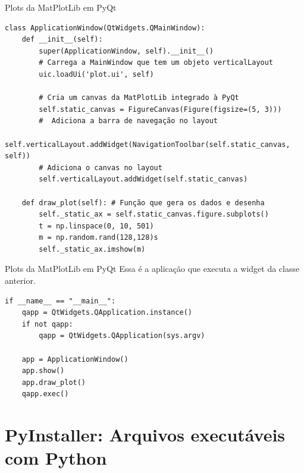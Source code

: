 \documentclass{beamer}
\begin{document}
\begin{frame}[fragile]{Plots da MatPlotLib em PyQt}
    \begin{verbatim}
class ApplicationWindow(QtWidgets.QMainWindow):
    def __init__(self):
        super(ApplicationWindow, self).__init__()
        # Carrega a MainWindow que tem um objeto verticalLayout
        uic.loadUi('plot.ui', self)
    
        # Cria um canvas da MatPlotLib integrado à PyQt
        self.static_canvas = FigureCanvas(Figure(figsize=(5, 3)))
        #  Adiciona a barra de navegação no layout
        self.verticalLayout.addWidget(NavigationToolbar(self.static_canvas, self))
        # Adiciona o canvas no layout
        self.verticalLayout.addWidget(self.static_canvas)
    
    def draw_plot(self): # Função que gera os dados e desenha
        self._static_ax = self.static_canvas.figure.subplots()
        t = np.linspace(0, 10, 501)
        m = np.random.rand(128,128)s
        self._static_ax.imshow(m)
    \end{verbatim}
\end{frame}
\begin{frame}[fragile]{Plots da MatPlotLib em PyQt}
    Essa é a aplicação que executa a widget da classe anterior.
    \begin{verbatim}
if __name__ == "__main__":
    qapp = QtWidgets.QApplication.instance()
    if not qapp:
        qapp = QtWidgets.QApplication(sys.argv)
    
    app = ApplicationWindow()
    app.show()
    app.draw_plot()
    qapp.exec()
    \end{verbatim}
\end{frame}

\section{PyInstaller: Arquivos executáveis com Python}
\end{document}
